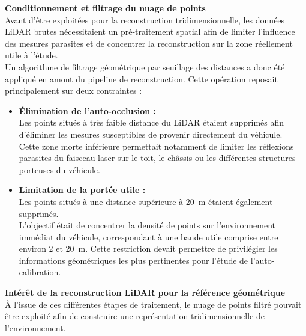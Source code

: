 \documentclass[12pt,a4paper,oneside]{report}
\begin{document}
\hspace*{0.4cm}\textbf{Conditionnement et filtrage du nuage de points}\\

\hspace*{.3cm}Avant d'être exploitées pour la reconstruction tridimensionnelle, les données LiDAR brutes nécessitaient un pré-traitement spatial afin de limiter l'influence des mesures parasites et de concentrer la reconstruction sur la zone réellement utile à l'étude.\\

\hspace*{.3cm}Un algorithme de filtrage géométrique par seuillage des distances a donc été appliqué en amont du pipeline de reconstruction. Cette opération reposait principalement sur deux contraintes :

\begin{itemize}[itemsep=0.5em]

\item \textbf{Élimination de l'auto-occlusion :}\\
Les points situés à très faible distance du LiDAR étaient supprimés afin d'éliminer les mesures susceptibles de provenir directement du véhicule.\\
Cette zone morte inférieure permettait notamment de limiter les réflexions parasites du faisceau laser sur le toit, le châssis ou les différentes structures porteuses du véhicule.

\item \textbf{Limitation de la portée utile :}\\
Les points situés à une distance supérieure à 20~m étaient également supprimés.\\
L'objectif était de concentrer la densité de points sur l'environnement immédiat du véhicule, correspondant à une bande utile comprise entre environ 2 et 20~m. Cette restriction devait permettre de privilégier les informations géométriques les plus pertinentes pour l'étude de l'auto-calibration.

\end{itemize}

\par\bigskip
\par\bigskip

\hspace*{0.4cm}\textbf{Intérêt de la reconstruction LiDAR pour la référence géométrique}\\

\hspace*{.3cm}À l'issue de ces différentes étapes de traitement, le nuage de points filtré pouvait être exploité afin de construire une représentation tridimensionnelle de l'environnement.\\
\end{document}
